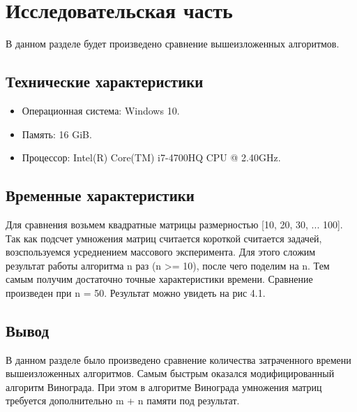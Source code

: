 \chapter{Исследовательская часть}

В данном разделе будет произведено сравнение вышеизложенных алгоритмов.

\section{Технические характеристики}

\begin{itemize}
	\item Операционная система: Windows 10.
	\item Память: 16 GiB.
	\item Процессор: Intel(R) Core(TM) i7-4700HQ CPU @ 2.40GHz.
\end{itemize}


\section{Временные характеристики}

Для сравнения возьмем квадратные матрицы размерностью [10, 20, 30, ... 100]. Так как подсчет умножения матриц считается короткой считается задачей, возспользуемся усреднением массового эксперимента. Для этого сложим результат работы алгоритма n раз (n >= 10), после чего поделим на n. Тем самым получим достаточно точные характеристики времени. Сравнение произведен при n = 50. Результат можно увидеть на рис 4.1.

\clearpage
{}
\clearpage
{}


\section*{Вывод}

В данном разделе было произведено сравнение количества затраченного времени вышеизложенных алгоритмов. Самым быстрым оказался модифицированный алгоритм Винограда. При этом в алгоритме Винограда умножения матриц требуется дополнительно m + n памяти под результат.